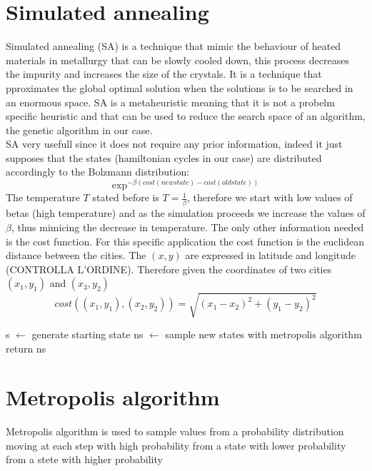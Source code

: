 \documentclass{article}
\begin{document}
\section{Simulated annealing}
Simulated annealing (SA) is a technique that mimic the behaviour of heated materials in metallurgy that can be slowly cooled down, this process decreases the impurity and increases the size of the crystals. It is a technique that pproximates the global optimal solution when the solutions is to be searched in an enormous space. SA is a metaheuristic meaning that it is not a probelm specific heuristic and that can be used to reduce the search space of an algorithm, the genetic algorithm in our case.\\
SA very usefull since it does not require any prior information, indeed it just supposes that the states (hamiltonian cycles in our case) are distributed accordingly to the Bolzmann distribution:
\begin{equation}
\exp^{- \beta (cost(new state) - cost(old state))}
\end{equation}
The temperature $T$ stated before is $T = \frac{1}{\beta}$, therefore we start with low values of betas (high temperature) and as the simulation proceeds we increase the values of $\beta$, thus mimicing the decrease in temperature.
The only other information needed is the cost function. For this specific application the cost function is the euclidean distance between the cities. The $(x,y)$ are expressed in latitude and longitude (CONTROLLA L'ORDINE). Therefore given the coordinates of two cities  $(x_1,y_1)$ and $(x_3,y_2)$
\begin{equation}
cost((x_1,y_1),(x_2,y_2)) = \sqrt{(x_1-x_2)^2 + (y_1-y_2)^2}
\end{equation}

\begin{algorithm}[h]
    \begin{algorithmic}[1]
        \State s $\leftarrow$ generate starting state
         	\State ns  $\leftarrow$ sample new states with metropolis algorithm
         	\EndFor
        \EndFor
        \State return ns
       \EndFunction
\end{algorithmic}
\end{algorithm}

\section{Metropolis algorithm}
Metropolis algorithm is used to sample values from a probability distribution moving at each step with high probability from a state with lower probability from a stete with higher probability
\end{document}
